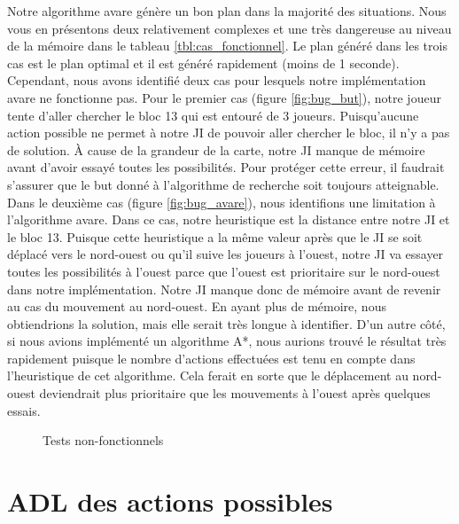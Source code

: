 \documentclass[12pt,letterpaper]{article}
\begin{document}
Notre algorithme avare génère un bon plan dans la majorité des situations. Nous vous en présentons deux relativement complexes et une très dangereuse au niveau de la mémoire dans le tableau \ref{tbl:cas_fonctionnel}. Le plan généré dans les trois cas est le plan optimal et il est généré rapidement (moins de 1 seconde). Cependant, nous avons identifié deux cas pour lesquels notre implémentation avare ne fonctionne pas. Pour le premier cas (figure \ref{fig:bug_but}), notre joueur tente d'aller chercher le bloc 13 qui est entouré de 3 joueurs. Puisqu'aucune action possible ne permet à notre JI de pouvoir aller chercher le bloc, il n'y a pas de solution. À cause de la grandeur de la carte, notre JI manque de mémoire avant d'avoir essayé toutes les possibilités. Pour protéger cette erreur, il faudrait s'assurer que le but donné à l'algorithme de recherche soit toujours atteignable. Dans le deuxième cas (figure \ref{fig:bug_avare}), nous identifions une limitation à l'algorithme avare. Dans ce cas, notre heuristique est la distance entre notre JI et le bloc 13. Puisque cette heuristique a la même valeur après que le JI se soit déplacé vers le nord-ouest ou qu'il suive les joueurs à l'ouest, notre JI va essayer toutes les possibilités à l'ouest parce que l'ouest est prioritaire sur le nord-ouest dans notre implémentation. Notre JI manque donc de mémoire avant de revenir au cas du mouvement au nord-ouest. En ayant plus de mémoire, nous obtiendrions la solution, mais elle serait très longue à identifier. D'un autre côté, si nous avions implémenté un algorithme A*, nous aurions trouvé le résultat très rapidement puisque le nombre d'actions effectuées est tenu en compte dans l'heuristique de cet algorithme. Cela ferait en sorte que le déplacement au nord-ouest deviendrait plus prioritaire que les mouvements à l'ouest après quelques essais.

\begin{figure}
  \centering
  \hspace*{0.5in}
  \caption{Tests non-fonctionnels}
  \label{fig:bug}
\end{figure}

\section{ADL des actions possibles} %
\end{document}
